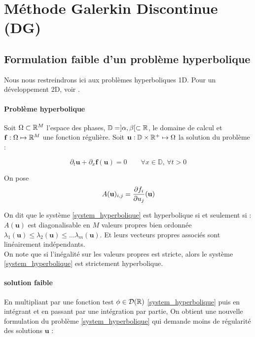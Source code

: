 
\section{Méthode Galerkin Discontinue (DG)}
\subsection{Formulation faible d'un problème hyperbolique}

Nous nous restreindrons ici aux problèmes hyperboliques 1D. Pour un développement 2D, voir \cite{VILAR2025}. 

\paragraph{Problème hyperbolique \\}
Soit $\Omega\subset \mathbb{R}^M$ l'espace des phases, $\mathbb{D} =]\alpha,\beta[ \subset \mathbb{R}$, le domaine de calcul et $\mathbf{f} : \Omega \mapsto \mathbb{R}^M$ une fonction régulière. 
Soit $\mathbf{u} : \mathbb{D} \times \mathbb{R}^+ \mapsto \Omega$ la solution du problème : 

\begin{equation}\label{system_hyperbolique}
    \partial_t \mathbf{u} + \partial_x \mathbf{f}(\mathbf{u}) = 0 \qquad \forall x \in \mathbb{D},\, \forall t >0
\end{equation}

On pose 
\begin{equation*}
    A(\mathbf{u})_{i,j} = \frac{\partial f_i}{\partial u_j} (\mathbf{u}) \\
\end{equation*}

On dit que le système \eqref{system_hyperbolique} est hyperbolique si et seulement si : 
$A(\mathbf{u})$ est diagonalisable en $M$ valeurs propres bien ordonnée $\lambda_1(\mathbf{u})\leq \lambda_2(\mathbf{u}) \leq \dots \lambda_m(\mathbf{u})$.
Et leurs vecteurs propres associés sont linéairement indépendants.\\
On note que si l'inégalité sur les valeurs propres est stricte, alors le système \eqref{system_hyperbolique} est strictement hyperbolique.\\

\paragraph{solution faible \\}

En multipliant par une fonction test $\phi \in \mathcal{D}(\mathbb{R})$ \eqref{system_hyperbolique} puis en intégrant et en passant par une intégration par partie, 
On obtient une nouvelle formulation du problème \eqref{system_hyperbolique} qui demande moins de régularité des solutions $\mathbf{u}$ : 

